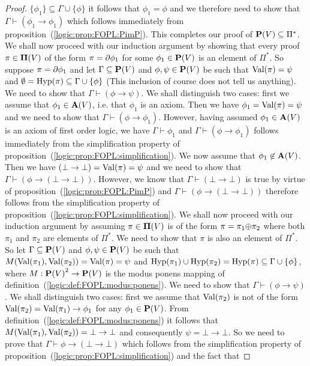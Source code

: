 \begin{proof}
$\{\phi_{1}\}\subseteq\Gamma\cup\{\phi\}$ it follows that
$\phi_{1}=\phi$ and we therefore need to show that
$\Gamma\vdash(\phi_{1}\to\phi_{1})$ which follows immediately from
proposition~(\ref{logic:prop:FOPL:PimP}). This completes our proof
of $\mbox{${\bf P}(V)$}\subseteq\Pi^{*}$. We shall now proceed with our induction
argument by showing that every proof $\pi\in\mbox{${\bf\Pi}(V)$}$ of the form
$\pi=\mbox{$\partial$}\phi_{1}$ for some $\phi_{1}\in\mbox{${\bf P}(V)$}$ is an element of
$\Pi^{*}$. So suppose $\pi=\mbox{$\partial$}\phi_{1}$ and let
$\Gamma\subseteq\mbox{${\bf P}(V)$}$ and $\phi,\psi\in\mbox{${\bf P}(V)$}$ be such that
$\mbox{\rm Val}(\pi)=\psi$ and
$\emptyset=\mbox{\rm Hyp}(\pi)\subseteq\Gamma\cup\{\phi\}$ (This inclusion of
course does not tell us anything). We need to show that
$\Gamma\vdash(\phi\to\psi)$. We shall distinguish two cases: first
we assume that $\phi_{1}\in\mbox{${\bf A}(V)$}$, i.e. that $\phi_{1}$ is an axiom.
Then we have $\phi_{1}=\mbox{\rm Val}(\pi)=\psi$ and we need to show that
$\Gamma\vdash(\phi\to\phi_{1})$. However, having assumed
$\phi_{1}\in\mbox{${\bf A}(V)$}$ is an axiom of first order logic, we have
$\Gamma\vdash\phi_{1}$ and $\Gamma\vdash(\phi\to\phi_{1})$ follows
immediately from the simplification property of
proposition~(\ref{logic:prop:FOPL:simplification}). We now assume
that $\phi_{1}\not\in\mbox{${\bf A}(V)$}$. Then we have
$(\bot\to\bot)=\mbox{\rm Val}(\pi)=\psi$ and we need to show that
$\Gamma\vdash(\phi\to(\bot\to\bot))$. However, we know that
$\Gamma\vdash(\bot\to\bot)$ is true by virtue of
proposition~(\ref{logic:prop:FOPL:PimP}) and
$\Gamma\vdash(\phi\to(\bot\to\bot))$ therefore follows from the
simplification property of
proposition~(\ref{logic:prop:FOPL:simplification}). We shall now
proceed with our induction argument by assuming $\pi\in\mbox{${\bf\Pi}(V)$}$ is of
the form $\pi=\pi_{1}\mbox{$\oplus$}\pi_{2}$ where both $\pi_{1}$ and $\pi_{2}$
are elements of $\Pi^{*}$. We need to show that $\pi$ is also an
element of $\Pi^{*}$. So let $\Gamma\subseteq\mbox{${\bf P}(V)$}$ and
$\phi,\psi\in\mbox{${\bf P}(V)$}$ be such that
$M(\mbox{\rm Val}(\pi_{1}),\mbox{\rm Val}(\pi_{2}))=\mbox{\rm Val}(\pi)=\psi$ and
$\mbox{\rm Hyp}(\pi_{1})\cup\mbox{\rm Hyp}(\pi_{2})=\mbox{\rm Hyp}(\pi)\subseteq\Gamma\cup\{\phi\}$,
where $M:\mbox{${\bf P}(V)$}^{2}\to\mbox{${\bf P}(V)$}$ is the modus ponens mapping of
definition~(\ref{logic:def:FOPL:modus:ponens}). We need to show that
$\Gamma\vdash(\phi\to\psi)$. We shall distinguish two cases: first
we assume that $\mbox{\rm Val}(\pi_{2})$ is not of the form
$\mbox{\rm Val}(\pi_{2})=\mbox{\rm Val}(\pi_{1})\to\phi_{1}$ for any $\phi_{1}\in\mbox{${\bf P}(V)$}$.
From definition~(\ref{logic:def:FOPL:modus:ponens}) it follows that
$M(\mbox{\rm Val}(\pi_{1}),\mbox{\rm Val}(\pi_{2}))= \bot\to\bot$ and consequently
$\psi=\bot\to\bot$. So we need to prove that
$\Gamma\vdash\phi\to(\bot\to\bot)$ which follows from the
simplification property of
proposition~(\ref{logic:prop:FOPL:simplification}) and the fact that

\end{proof}
